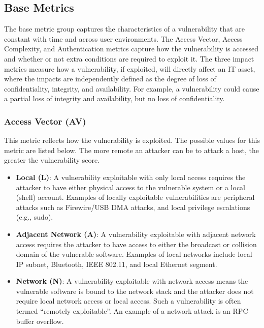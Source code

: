     \subsection{Base Metrics}\label{subsec:base-metrics}

    The base metric group captures the characteristics of a vulnerability
    that are constant with time and across user environments. The Access
    Vector, Access Complexity, and Authentication metrics capture how the
    vulnerability is accessed and whether or not extra conditions are
    required to exploit it. The three impact metrics measure how a
    vulnerability, if exploited, will directly affect an IT asset, where the
    impacts are independently defined as the degree of loss of
    confidentiality, integrity, and availability. For example, a
    vulnerability could cause a partial loss of integrity and availability,
    but no loss of confidentiality.

    \subsubsection{Access Vector (AV)}\label{subsec:access-vector-av}

    This metric reflects how the vulnerability is exploited. The possible
    values for this metric are listed below. The more remote an
    attacker can be to attack a host, the greater the vulnerability score.

    \begin{itemize}
      \item
        \textbf{Local (L)}: A vulnerability exploitable with only local access
        requires the attacker to have either physical access to the vulnerable
        system or a local (shell) account. Examples of locally exploitable
        vulnerabilities are peripheral attacks such as Firewire/USB DMA
        attacks, and local privilege escalations (e.g., sudo).
      \item
        \textbf{Adjacent Network (A)}: A vulnerability exploitable with
        adjacent network access requires the attacker to have access to either
        the broadcast or collision domain of the vulnerable software. Examples
        of local networks include local IP subnet, Bluetooth, IEEE 802.11, and
        local Ethernet segment.
      \item
        \textbf{Network (N)}: A vulnerability exploitable with network access
        means the vulnerable software is bound to the network stack and the
        attacker does not require local network access or local access. Such a
        vulnerability is often termed ``remotely exploitable''. An example of
        a network attack is an RPC buffer overflow.
    \end{itemize}

